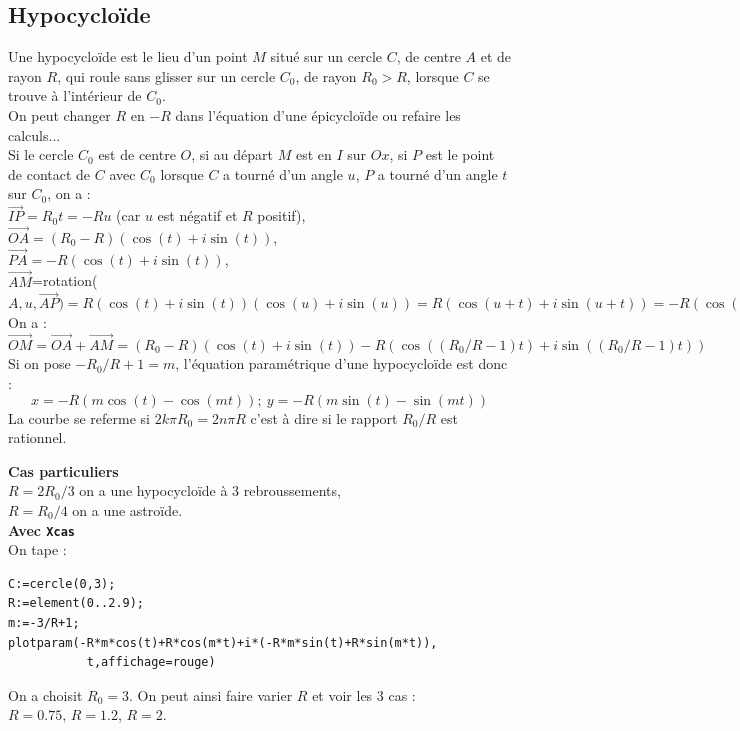 \documentclass[a4paper,11pt]{book}
\begin{document}
\subsection{Hypocyclo\"ide}
Une hypocyclo\"ide est le lieu d'un point $M$ situ\'e sur un cercle $C$, de 
centre $A$ et de rayon $R$, qui roule sans glisser sur un cercle $C_0$, de 
rayon $R_0>R$, lorsque $C$ se trouve \`a l'int\'erieur de $C_0$.\\
On peut changer $R$ en $-R$ dans l'\'equation d'une \'epicyclo\"ide ou refaire 
les calculs...\\
Si le cercle $C_0$ est de centre $O$, si au d\'epart $M$ est en $I$ sur $Ox$, 
 si $P$ est le point de contact de $C$ avec 
$C_0$ lorsque $C$ a tourn\'e d'un angle $u$, $P$ a tourn\'e d'un angle 
$t$ sur $C_0$, on a :\\
$\overrightarrow{IP}=R_0t=-Ru$ (car $u$ est n\'egatif et $R$ positif),\\
$\overrightarrow{OA}=(R_0-R)(\cos(t)+i\sin(t))$,\\
$\overrightarrow{PA}=-R(\cos(t)+i\sin(t))$,\\
$\overrightarrow{AM}$=rotation($A,u,\overrightarrow{AP})=R(\cos(t)+i\sin(t))(\cos(u)+i\sin(u))=R(\cos(u+t)+i\sin(u+t))=-R(\cos((R_0/R-1)t)+i\sin((R_0/R-1)t))$\\
On a :\\
$\overrightarrow{OM}=\overrightarrow{OA}+\overrightarrow{AM}=(R_0-R)(\cos(t)+i\sin(t))-R(\cos((R_0/R-1)t)+i\sin((R_0/R-1)t))$\\
Si on pose $-R_0/R+1=m$, l'\'equation param\'etrique d'une hypocyclo\"ide est 
donc :\\
$$x=-R(m\cos(t)-\cos(mt)); \ y=-R(m\sin(t)-\sin(mt))$$ 
La courbe se referme si $2k\pi R_0=2n\pi R$ c'est \`a dire si le rapport 
$R_0/R$ est rationnel.

{\bf Cas particuliers}\\
$R=2R_0/3$ on a une hypocyclo\"ide \`a 3 rebroussements,\\
$R=R_0/4$ on a une astro\"ide.\\
{\bf Avec {\tt Xcas}}\\
On tape :
\begin{verbatim}
C:=cercle(0,3);
R:=element(0..2.9);
m:=-3/R+1;
plotparam(-R*m*cos(t)+R*cos(m*t)+i*(-R*m*sin(t)+R*sin(m*t)),
           t,affichage=rouge)
\end{verbatim}
On a choisit $R_0=3$. On peut ainsi faire varier $R$ et voir les 3 cas :\\
$R=0.75$, $R=1.2$, $R=2$.
\end{document}
